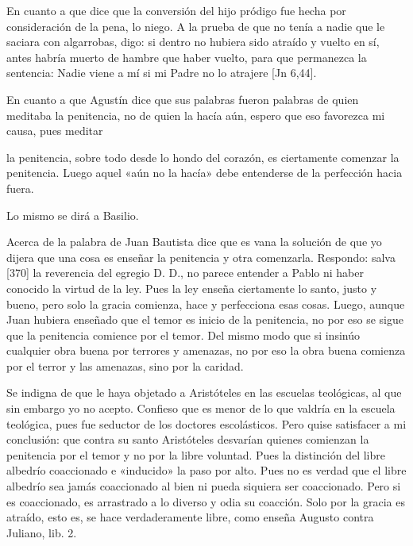 En cuanto a que dice que la conversión del hijo pródigo fue hecha por consideración de la pena, lo niego. A la prueba de que no tenía a nadie que le saciara con algarrobas, digo: si dentro no hubiera sido atraído y vuelto en sí, antes habría muerto de hambre que haber vuelto, para que permanezca la sentencia: Nadie viene a mí si mi Padre no lo atrajere [Jn 6,44].

En cuanto a que Agustín dice que sus palabras fueron palabras de quien meditaba la penitencia, no de quien la hacía aún, espero que eso favorezca mi causa, pues meditar

la penitencia, sobre todo desde lo hondo del corazón, es ciertamente comenzar la penitencia. Luego aquel «aún no la hacía» debe entenderse de la perfección hacia fuera.

Lo mismo se dirá a Basilio.

Acerca de la palabra de Juan Bautista dice que es vana la solución de que yo dijera que una cosa es enseñar la penitencia y otra comenzarla. Respondo: salva [370] la reverencia del egregio D. D., no parece entender a Pablo ni haber conocido la virtud de la ley. Pues la ley enseña ciertamente lo santo, justo y bueno, pero solo la gracia comienza, hace y perfecciona esas cosas. Luego, aunque Juan hubiera enseñado que el temor es inicio de la penitencia, no por eso se sigue que la penitencia comience por el temor. Del mismo modo que si insinúo cualquier obra buena por terrores y amenazas, no por eso la obra buena comienza por el terror y las amenazas, sino por la caridad.

Se indigna de que le haya objetado a Aristóteles en las escuelas teológicas, al que sin embargo yo no acepto. Confieso que es menor de lo que valdría en la escuela teológica, pues fue seductor de los doctores escolásticos. Pero quise satisfacer a mi conclusión: que contra su santo Aristóteles desvarían quienes comienzan la penitencia por el temor y no por la libre voluntad. Pues la distinción del libre albedrío coaccionado e «inducido» la paso por alto. Pues no es verdad que el libre albedrío sea jamás coaccionado al bien ni pueda siquiera ser coaccionado. Pero si es coaccionado, es arrastrado a lo diverso y odia su coacción. Solo por la gracia es atraído, esto es, se hace verdaderamente libre, como enseña Augusto contra Juliano, lib. 2.


